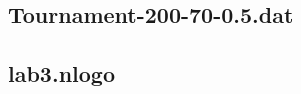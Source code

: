 \documentclass[titlepage, a4paper, 12pt]{article}
\begin{document}
\subsection{Tournament-200-70-0.5.dat}\label{Tournament-200-70-0.5.dat}
\begin{footnotesize}
  
\end{footnotesize}

\subsection{lab3.nlogo}\label{app:lab3.nlogo}
\begin{footnotesize}
  
\end{footnotesize}
\end{document}
